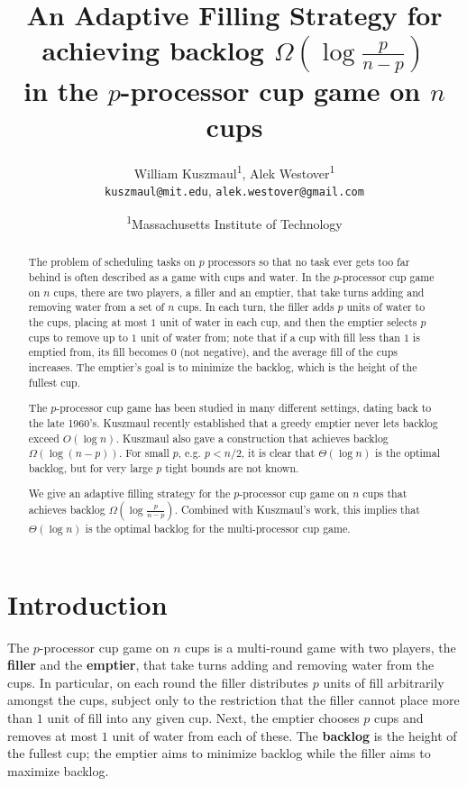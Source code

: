 \documentclass[11pt]{article}
\author{William Kuszmaul\textsuperscript{1}, Alek
Westover\textsuperscript{1}\\ 
\texttt{kuszmaul@mit.edu}, \texttt{alek.westover@gmail.com} }
\title{ An Adaptive Filling Strategy for achieving backlog
$\Omega(\log \frac{p}{n-p})$ \\ in the $p$-processor cup game on $n$ cups}
\date{\textsuperscript{1}Massachusetts Institute of Technology}
\begin{document}
\maketitle
\begin{abstract}
  The problem of scheduling tasks on $p$ processors so that no
  task ever gets too far behind is often described as a game with
  cups and water. In the $p$-processor cup game on $n$ cups,
  there are two players, a filler and an emptier, that take turns
  adding and removing water from a set of $n$ cups. In each turn,
  the filler adds $p$ units of water to the cups, placing at most
  $1$ unit of water in each cup, and then the emptier selects $p$
  cups to remove up to $1$ unit of water from; note that if a cup
  with fill less than $1$ is emptied from, its fill becomes $0$
  (not negative), and the average fill of the cups increases. The
  emptier's goal is to minimize the backlog, which is the height
  of the fullest cup.

  The $p$-processor cup game has been studied in many different
  settings, dating back to the late 1960's. Kuszmaul recently
  established that a greedy emptier never lets backlog exceed
  $O(\log n)$. Kuszmaul also gave a construction that achieves
  backlog $\Omega(\log (n-p))$. For small $p$, e.g. $p< n/2$, it
  is clear that $\Theta(\log n)$ is the optimal backlog, but for
  very large $p$ tight bounds are not known. 

  We give an adaptive filling strategy for the $p$-processor cup
  game on $n$ cups that achieves backlog $\Omega(\log
  \frac{p}{n-p})$. Combined with Kuszmaul's work, this implies
  that $\Theta(\log n)$ is the optimal backlog for the
  multi-processor cup game.
\end{abstract}

\section{Introduction}
The $p$-processor cup game on $n$ cups is a multi-round game
with two players, the \textbf{filler} and the \textbf{emptier},
that take turns adding and removing water from the cups. 
In particular, on each round the filler distributes $p$
units of fill arbitrarily amongst the cups, subject only to the
restriction that the filler cannot place more than $1$ unit of
fill into any given cup. Next, the emptier chooses $p$ cups and
removes at most $1$ unit of water from each of these.
The \textbf{backlog} is the height of the fullest cup; the emptier
aims to minimize backlog while the filler aims to maximize
backlog.
\end{document}
